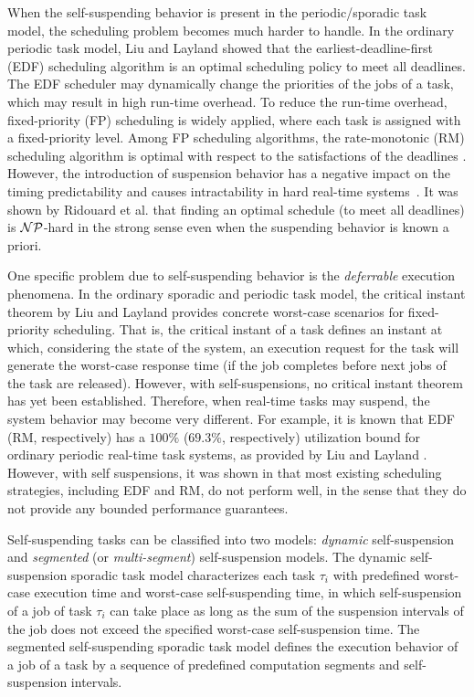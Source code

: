 
When the self-suspending behavior is present in the periodic/sporadic task model, the scheduling problem becomes much harder to handle. In the ordinary periodic task model, Liu and Layland showed that the earliest-deadline-first (EDF) scheduling algorithm is an optimal scheduling policy to meet all deadlines. The EDF scheduler may dynamically change the priorities of the jobs of a task, which may result in high run-time overhead. To reduce the run-time overhead, fixed-priority (FP) scheduling is widely applied, where each task is assigned with a fixed-priority level. Among FP scheduling algorithms, the rate-monotonic (RM) scheduling algorithm is optimal with respect to the satisfactions of the deadlines \cite{Liu_1973}. However, the introduction of suspension behavior has a negative impact on the timing predictability and causes intractability in hard real-time systems~\cite{Ridouard_2004}. It was shown by Ridouard et al. \cite{Ridouard_2004} that finding an optimal schedule (to meet all deadlines) is ${\cal NP}$-hard in the strong sense even when the suspending behavior is known a priori.


One specific problem due to self-suspending behavior is the \emph{deferrable} execution phenomena. In the ordinary sporadic and periodic task model, the critical instant theorem by Liu and Layland \cite{Liu_1973} provides concrete worst-case scenarios for fixed-priority scheduling.  That is, the critical instant of a task defines an instant at which, considering the state of the system, an execution request for the task will generate the worst-case response time (if the job completes before next jobs of the task are released).
However, with self-suspensions, no critical instant theorem has yet been established.
Therefore, when real-time tasks may suspend, the system behavior may become very different. For example, it is known that EDF (RM, respectively) has a $100\%$ ($69.3\%$, respectively) utilization bound for ordinary periodic real-time task systems, as provided by Liu and Layland \cite{Liu_1973}. However, with self suspensions,  it was shown in \cite{Ridouard_2004,RTSS-ChenL14} that most existing scheduling strategies, including EDF and RM, do not perform well, in the sense that they do not provide any bounded performance guarantees. 

Self-suspending tasks can be classified into two models: \emph{dynamic} self-suspension and \emph{segmented} (or \emph{multi-segment}) self-suspension models.
The dynamic self-suspension sporadic task model characterizes each
task $\tau_i$ with predefined worst-case execution time and worst-case self-suspending time, in which self-suspension of a job of task $\tau_i$ can take place as long as the sum of the suspension intervals of the job does not exceed the specified worst-case self-suspension time. The segmented self-suspending sporadic task model defines the execution behavior of a job of a task by a sequence of predefined computation segments and self-suspension intervals.  

